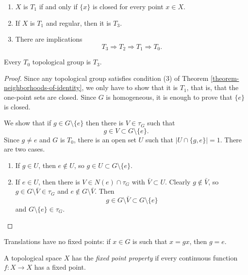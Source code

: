 \begin{remark}
\label{remark-separation-axioms}
\begin{enumerate}
\item $X$ is $T_1$ if and only if
$\{x\}$ is closed for every point
$x\in X$.
\item If $X$ is $T_1$ and regular, then
it is $T_3$.
\item There are implications
$$
T_3\Rightarrow T_2
\Rightarrow T_1\Rightarrow T_0.
$$
\end{enumerate}
\end{remark}

\begin{theorem}
\label{theorem-t0-implies-t3}
Every $T_0$ topological group is $T_3$.
\end{theorem}

\begin{proof}
Since any topological group satisfies
condition (3) of
Theorem
\ref{theorem-neighborhoods-of-identity},
we only have to show that it is $T_1$,
that is, that the one-point sets are
closed. Since $G$ is homogeneous, it is
enough to prove that $\{e\}$ is closed.

We show that if $g\in G\setminus\{e\}$
then there is $V\in\tau_G$ such that
$$
g\in V\subset G\setminus\{e\}.
$$
Since $g\neq e$ and $G$ is $T_0$, there
is an open set $U$ such that
$|U\cap\{g,e\}|=1$. There are two cases.
\begin{enumerate}
\item If $g\in U$, then $e\notin U$, so
$g\in U\subset G\setminus\{e\}$.
\item If $e\in U$, then there is
$V\in N(e)\cap\tau_G$ with
$\bar{V}\subset U$. Clearly
$g\notin\bar{V}$, so
$g\in G\setminus\bar{V}\in\tau_G$ and
$e\notin G\setminus\bar{V}$. Then
$$
g\in G\setminus\bar{V}
\subset G\setminus\{e\}
$$
and $G\setminus\{e\}\in\tau_G$.
\end{enumerate}
\end{proof}

\begin{remark}
\label{remark-translations-no-fixed-points}
Translations have no fixed points: if
$x\in G$ is such that $x=gx$, then
$g=e$.
\end{remark}

\begin{definition}
\label{definition-fixed-point-property}
A topological space $X$ has the
{\it fixed point property} if every
continuous function $f:X\to X$ has a
fixed point.
\end{definition}

